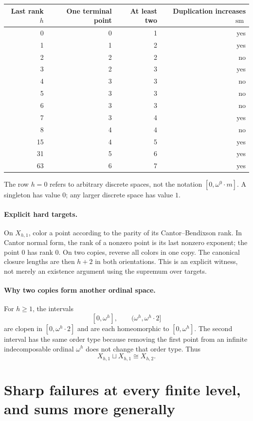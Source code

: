 \documentclass[11pt,letterpaper]{article}
\numberwithin{equation}{section}
\theoremstyle{definition}
\theoremstyle{remark}
\theoremstyle{definition}
\newcommand{\sm}{\operatorname{sm}}
\begin{document}
\begin{center}
\begin{tabular}{@{}rrrr@{}}
\toprule
Last rank $h$ & One terminal point & At least two & Duplication increases $\sm$\\
\midrule
0 & 0 & 1 & yes\\
1 & 1 & 2 & yes\\
2 & 2 & 2 & no\\
3 & 2 & 3 & yes\\
4 & 3 & 3 & no\\
5 & 3 & 3 & no\\
6 & 3 & 3 & no\\
7 & 3 & 4 & yes\\
8 & 4 & 4 & no\\
15 & 4 & 5 & yes\\
31 & 5 & 6 & yes\\
63 & 6 & 7 & yes\\
\bottomrule
\end{tabular}
\end{center}
The row $h=0$ refers to arbitrary discrete spaces, not the notation
$[0,\omega^0\cdot m]$. A singleton has value $0$; any larger discrete space has
value $1$.

\paragraph{Explicit hard targets.}
On $X_{h,1}$, color a point according to the parity of its Cantor--Bendixson
rank. In Cantor normal form, the rank of a nonzero point is its last nonzero
exponent; the point $0$ has rank $0$. On two copies, reverse all colors in one
copy. The canonical closure lengths are then $h+2$ in both orientations.
This is an explicit witness, not merely an existence argument using the
supremum over targets.

\paragraph{Why two copies form another ordinal space.}
For $h\geq1$, the intervals
\[
 [0,\omega^h],\qquad (\omega^h,\omega^h\cdot2]
\]
are clopen in $[0,\omega^h\cdot2]$ and are each homeomorphic to
$[0,\omega^h]$. The second interval has the same order type because removing
the first point from an infinite indecomposable ordinal $\omega^h$ does not
change that order type. Thus
\[
 X_{h,1}\sqcup X_{h,1}\cong X_{h,2}.
\]

\section{Sharp failures at every finite level, and sums more generally}
\end{document}
